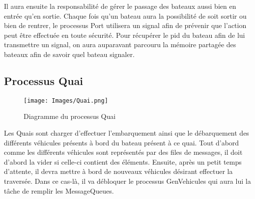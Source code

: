\documentclass[a4paper, 11pt]{article}
\begin{document}
		Il aura ensuite la responsabilité de gérer le passage des bateaux aussi bien en entrée qu'en sortie. Chaque fois qu'un bateau aura la possibilité de soit sortir ou bien de rentrer, le processus Port utilisera un signal afin de prévenir que l'action peut être effectuée en toute sécurité. Pour récupérer le pid du bateau afin de lui transmettre un signal, on aura auparavant parcouru la mémoire partagée des bateaux afin de savoir quel bateau signaler.
	\newpage
	\subsection{Processus Quai}
		\begin{figure}[!h]
			\centering
			\texttt{[image: Images/Quai.png]}
			\caption{Diagramme du processus Quai}
		\end{figure}
		Les Quais sont charger d'effectuer l'embarquement ainsi que le débarquement des différents véhicules présents à bord du bateau présent à ce quai. Tout d'abord comme les différents véhicules sont représentés par des files de messages, il doit d'abord la vider si celle-ci contient des éléments. Ensuite, après un petit temps d'attente, il devra mettre à bord de nouveaux véhicules désirant effectuer la traversée. Dans ce cas-là, il va débloquer le processus GenVehicules qui aura lui la tâche de remplir les MessageQueues.
\end{document}
